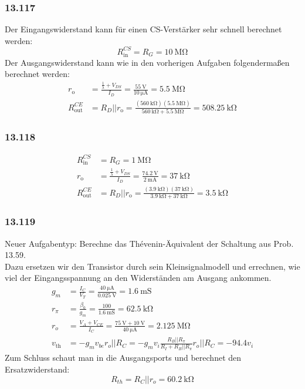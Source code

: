 \documentclass[11pt,a4paper,titlepage]{article}
\begin{document}
\subsubsection*{13.117}
Der Eingangswiderstand kann für einen CS-Verstärker sehr schnell berechnet werden:
\[ R_{\text{in}}^{CS} = R_G = \SI{10}{\mega\ohm} \]
Der Ausgangswiderstand kann wie in den vorherigen Aufgaben folgendermaßen berechnet werden:
\begin{equation}
\begin{aligned}
r_{\text{o}} &= \frac{\frac{1}{\lambda}+V_{DS}}{I_D} = \frac{\SI{55}{\volt}}{\SI{10}{\micro\ampere}} = \SI{5.5}{\mega\ohm} \\
R_{\text{out}}^{CE} &= R_D || r_{\text{o}} = \frac{(\SI{560}{\kilo\ohm})(\SI{5.5}{\mega\ohm})}{\SI{560}{\kilo\ohm} + \SI{5.5}{\mega\ohm}} = \SI{508.25}{\kilo\ohm}
\end{aligned}
\end{equation}

\subsubsection*{13.118}
\begin{equation}
\begin{aligned}
R_{\text{in}}^{CS} &= R_G = \SI{1}{\mega\ohm}\\
r_{\text{o}} &= \frac{\frac{1}{\lambda}+V_{DS}}{I_D} = \frac{\SI{74.2}{\volt}}{\SI{2}{\milli\ampere}} = \SI{37}{\kilo\ohm} \\
R_{\text{out}}^{CE} &= R_D || r_{\text{o}} = \frac{(\SI{3.9}{\kilo\ohm})(\SI{37}{\kilo\ohm})}{\SI{3.9}{\kilo\ohm} + \SI{37}{\kilo\ohm}} = \SI{3.5}{\kilo\ohm}
\end{aligned}
\end{equation}

\subsubsection*{13.119}
Neuer Aufgabentyp: Berechne das Thévenin-Äquivalent der Schaltung aus Prob. 13.59.\\
Dazu ersetzen wir den Transistor durch sein Kleinsignalmodell und errechnen, wie viel der Eingangsspannung an den Widerständen am Ausgang ankommen. 
\begin{equation}
	\begin{aligned}
	g_m &= \frac{I_C}{V_T} = \frac{\SI{40}{\micro\ampere}}{\SI{0.025}{\volt}} = \SI{1.6}{\milli\siemens} \\
	r_{\pi} &= \frac{\beta_0}{g_m} = \frac{100}{\SI{1.6}{\milli\siemens}} = \SI{62.5}{\kilo\ohm} \\
	r_o &= \frac{V_A+V_{CE}}{I_C} = \frac{\SI{75}{\volt} + \SI{10}{\volt}}{\SI{40}{\micro\ampere}} = \SI{2.125}{\mega\ohm} \\
	v_{\text{th}} &= -g_mv_{be}r_o||R_C = -g_mv_i\frac{R_B||R_{\pi}}{R_I + R_B||R_{\pi}}r_o||R_C = -94.4v_i
	\end{aligned}
\end{equation}
Zum Schluss schaut man in die Ausgangsports und berechnet den Ersatzwiderstand:
\[ R_{th} = R_C||r_o = \SI{60.2}{\kilo\ohm} \]
\end{document}
